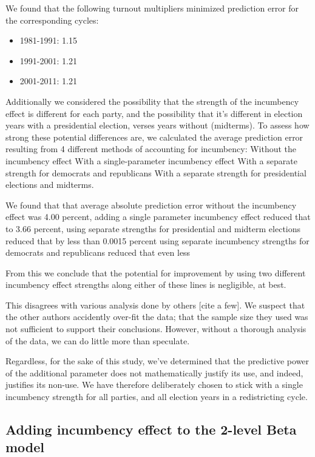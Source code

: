 \documentclass[preprint,12pt]{article}
\begin{document}
We found that the following turnout multipliers minimized prediction error for the corresponding cycles:

\begin{itemize}
\item 1981-1991: 1.15
\item 1991-2001: 1.21
\item 2001-2011: 1.21
\end{itemize}

Additionally we considered the possibility that the strength of the incumbency effect is different for each party, and the possibility that it's different in election years with a presidential election, verses years without (midterms).  To assess how strong these potential differences are, we calculated the average prediction error resulting from 4 different methods of accounting for incumbency:
Without the incumbency effect
With a single-parameter incumbency effect
With a separate strength for democrats and republicans
With a separate strength for presidential elections and midterms.

We found that that average absolute prediction error 
without the incumbency effect was 4.00 percent, 
adding a single parameter incumbency effect reduced that to 3.66 percent, 
using separate strengths for presidential and midterm elections reduced that by less than 0.0015 percent
using separate incumbency strengths for democrats and republicans reduced that even less

From this we conclude that the potential for improvement by using two different incumbency effect strengths along either of these lines is negligible, at best.  

This disagrees with various analysis done by others [cite a few].  We suspect that the other authors accidently over-fit the data; that the sample size they used was not sufficient to support their conclusions. However, without a thorough analysis of the data, we can do little more than speculate.

Regardless, for the sake of this study, we've determined that the predictive power of the additional parameter does not mathematically justify its use, and indeed, justifies its non-use.  We have therefore deliberately chosen to stick with a single incumbency strength for all parties, and all election years in a redistricting cycle.

\subsection{Adding incumbency effect to the 2-level Beta model}
\end{document}
